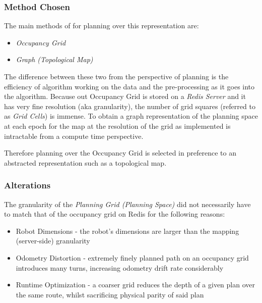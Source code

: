 \documentclass[11pt, a4paper]{article}
\begin{document}
\subsubsection{Method Chosen}

The main methods of for planning over this representation are: \cite{path_space}

\begin{itemize}
	\item \textit{Occupancy Grid}
	\item \textit{Graph (Topological Map)}
\end{itemize}


The difference between these two from the perspective of planning is the efficiency of algorithm working 
on the data and the pre-processing as it goes into the algorithm. Because out Occupancy Grid is stored 
on a \textit{Redis Server} and it has very fine resolution (aka granularity), the number of grid 
squares (referred to as \textit{Grid Cells}) is immense. To obtain a graph representation of the
planning space at each epoch for the map at the resolution of the grid as implemented is
intractable from a compute time perspective.

Therefore planning over the Occupancy Grid is selected in preference to an abstracted representation
such as a topological map.

\subsubsection{Alterations}

The granularity of the \textit{Planning Grid (Planning Space)} did not necessarily have to match that 
of the occupancy grid on Redis for the following reasons:

\begin{itemize}

	\item Robot Dimensions     - the robot's dimensions are larger than the mapping (server-side) 
granularity
	\item Odometry Distortion  - extremely finely planned path on an occupancy grid introduces many 
turns, increasing odometry drift rate considerably \cite{task2_report}
	\item Runtime Optimization - a coarser grid reduces the depth of a given plan over the same route,
whilst sacrificing physical parity of said plan

\end{itemize}
\end{document}
